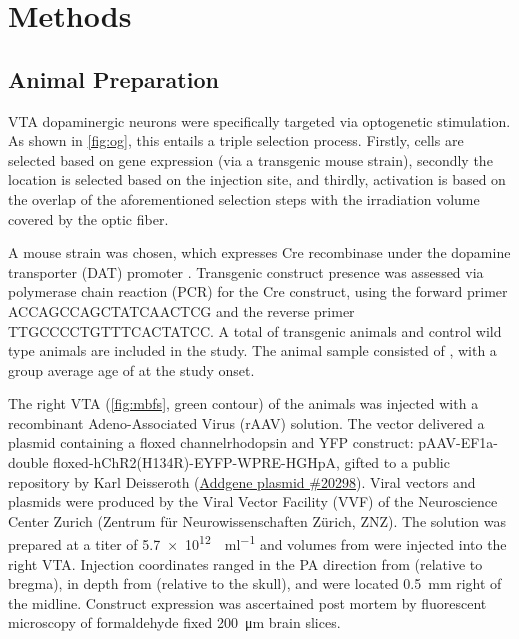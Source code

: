 \section{Methods}

\subsection{Animal Preparation}

VTA dopaminergic neurons were specifically targeted via optogenetic stimulation.
As shown in \cref{fig:og}, this entails a triple selection process.
Firstly, cells are selected based on gene expression (via a transgenic mouse strain), secondly the location is selected based on the injection site, and thirdly, activation is based on the overlap of the aforementioned selection steps with the irradiation volume covered by the optic fiber.

A mouse strain was chosen, which expresses Cre recombinase under the dopamine transporter (DAT) promoter \cite{dat}.
Transgenic construct presence was assessed via polymerase chain reaction (PCR) for the Cre construct, using the forward primer ACCAGCCAGCTATCAACTCG and the reverse primer TTGCCCCTGTTTCACTATCC.
A total of  transgenic animals and  control wild type animals are included in the study.
The animal sample consisted of , with a group average age of  at the study onset.

The right VTA (\cref{fig:mbfs}, green contour) of the animals was injected with a recombinant Adeno-Associated Virus (rAAV) solution.
The vector delivered a plasmid containing a floxed channelrhodopsin and YFP construct:
pAAV-EF1a-double floxed-hChR2(H134R)-EYFP-WPRE-HGHpA, gifted to a public repository by Karl Deisseroth (\href{https://www.addgene.org/20298/}{Addgene plasmid \#20298}).
Viral vectors and plasmids were produced by the Viral Vector Facility (VVF) of the Neuroscience Center Zurich (Zentrum für Neurowissenschaften Zürich, ZNZ).
The solution was prepared at a titer of \SI{5.7e12}{\vg\per\milli\litre} and volumes from
were injected into the right VTA.
Injection coordinates ranged in the PA direction from
 (relative to bregma),
in depth from
 (relative to the skull),
and were located \SI{0.5}{\milli\meter} right of the midline.
Construct expression was ascertained post mortem by fluorescent microscopy of formaldehyde fixed \SI{200}{\micro\metre} brain slices.

